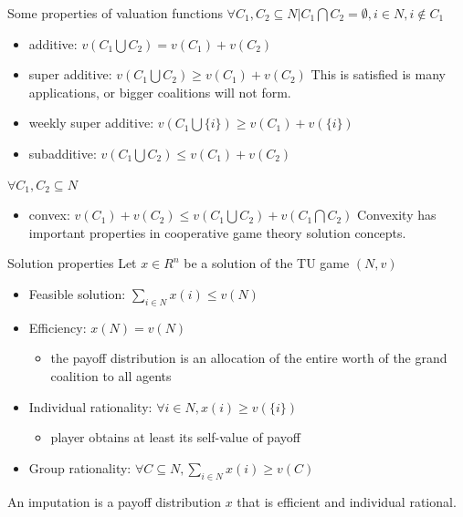 \documentclass{beamer}
\begin{document}
\begin{frame}{Some properties of valuation functions}
    $\forall C_1,C_2 \subseteq N | C_1 \bigcap C_2 = \emptyset, i \in N, i \notin C_1$
    \begin{itemize}
        \item {\color{red} additive:} $v(C_1 \bigcup C_2) = v(C_1) + v(C_2)$
        \item {\color{red} super additive:} $v(C_1 \bigcup C_2) \geq v(C_1) + v(C_2)$ This is satisfied is many applications, or bigger coalitions will not form.
        \item {\color{red} weekly super additive:} $v(C_1 \bigcup \{i\}) \geq v(C_1) + v(\{i\})$
        \item {\color{red} subadditive:} $v(C_1 \bigcup C_2) \leq v(C_1) + v(C_2)$
    \end{itemize}

    $\forall C_1,C_2 \subseteq N$
    \begin{itemize}
        \item {\color{red} convex:} $v(C_1) + v(C_2) \leq v(C_1 \bigcup C_2) + v(C_1 \bigcap C_2)$ Convexity has important properties in cooperative game theory solution concepts.
    \end{itemize}
\end{frame}
\begin{frame}{Solution properties}
    Let $x \in R^n$ be a solution of the TU game $(N,v)$
    \begin{itemize}
        \item {\color{red} Feasible solution:} $\sum_{i \in N} x(i) \leq v(N)$
        \item {\color{red} Efficiency:} $x(N) = v(N)$
        \begin{itemize}
            \item the payoff distribution is an allocation of the entire worth of the grand coalition to all agents
        \end{itemize}
        \item {\color{red} Individual rationality:} $\forall i \in N, x(i) \geq v(\{i\})$
        \begin{itemize}
            \item player obtains at least its self-value of payoff
        \end{itemize}
        \item {\color{red} Group rationality:} $\forall C \subseteq N, \sum_{i \in N} x(i) \geq v(C)$
    \end{itemize}

    \vspace{0.2cm}

    An {\color{red} imputation} is a payoff distribution $x$ that is efficient and individual rational.

\end{frame}
\end{document}

